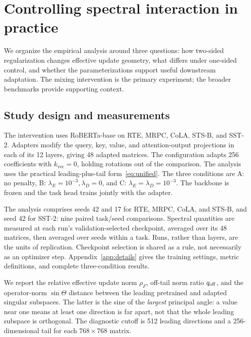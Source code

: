 \section{Controlling spectral interaction in practice}
\label{sec:experiments}

We organize the empirical analysis around three questions: how two-sided regularization changes effective update geometry, what differs under one-sided control, and whether the parameterizations support useful downstream adaptation. The mixing intervention is the primary experiment; the broader benchmarks provide supporting context.

\subsection{Study design and measurements}
The intervention uses RoBERTa-base on RTE, MRPC, CoLA, STS-B, and SST-2. Adapters modify the query, key, value, and attention-output projections in each of its 12 layers, giving 48 adapted matrices. The configuration adapts 256 coefficients with $k_{\mathrm{vec}}=0$, holding rotations out of the comparison. The analysis uses the practical leading-plus-tail form~\eqref{eq:unified}. The three conditions are A: no penalty, B: $\lambda_E=10^{-3},\lambda_D=0$, and C: $\lambda_E=\lambda_D=10^{-3}$. The backbone is frozen and the task head trains jointly with the adapter.

The analysis comprises seeds 42 and 17 for RTE, MRPC, CoLA, and STS-B, and seed 42 for SST-2: nine paired task/seed comparisons. Spectral quantities are measured at each run's validation-selected checkpoint, averaged over its 48 matrices, then averaged over seeds within a task. Runs, rather than layers, are the units of replication. Checkpoint selection is shared as a rule, not necessarily as an optimizer step. Appendix~\ref{app:details} gives the training settings, metric definitions, and complete three-condition results.

We report the relative effective update norm $\rho_F$, off-tail norm ratio $q_{\mathrm{off}}$, and the operator-norm $\sin\Theta$ distance between the leading pretrained and adapted singular subspaces. The latter is the sine of the \emph{largest} principal angle: a value near one means at least one direction is far apart, not that the whole leading subspace is orthogonal. The diagnostic cutoff is 512 leading directions and a 256-dimensional tail for each $768\times768$ matrix.

